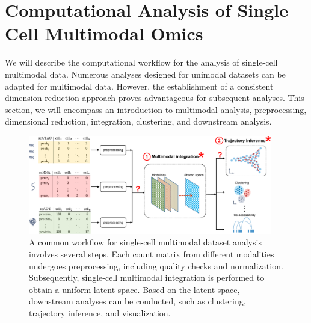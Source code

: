 \section{Computational Analysis of Single Cell Multimodal Omics}
\label{background:multimodal}
We will describe the computational workflow for the analysis of single-cell multimodal data. Numerous analyses designed for unimodal datasets can be adapted for multimodal data. However, the establishment of a consistent dimension reduction approach proves advantageous for subsequent analyses. This section, we will encompass an introduction to multimodal analysis,  preprocessing, dimensional reduction, integration, clustering, and downstream analysis.

\begin{figure}[!ht]
	\centering
	\includegraphics[width=0.95\textwidth]{workflow_multimodal/fig}
	\vspace{0.1cm}
	\caption[A common computational multimodal analysis workflow.]{A common workflow for single-cell multimodal dataset analysis involves several steps. Each count matrix from different modalities undergoes preprocessing, including quality checks and normalization. Subsequently, single-cell multimodal integration is performed to obtain a uniform latent space. Based on the latent space, downstream analyses can be conducted, such as clustering, trajectory inference, and visualization.}
	\label{fig:workflow_multimodal}
\end{figure}

